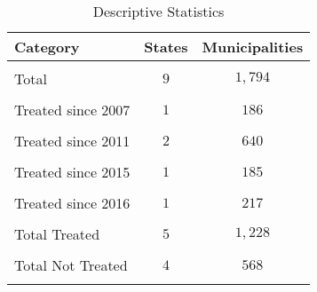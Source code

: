 \documentclass{article}
\begin{document}
\begin{table}[!htbp] \centering 
  \caption{Descriptive Statistics} 
  \label{} 
\normalsize 
\begin{tabular}{@{} l c c @{}} 
\hline \hline
Category & States & Municipalities \\ 
\hline \\
Total & $9$ & $1,794$ \\\\ [0.5em]
Treated since 2007 & $1$ & $186$ \\\\
Treated since 2011 & $2$ & $640$ \\\\
Treated since 2015 & $1$ & $185$ \\\\ 
Treated since 2016 & $1$ & $217$ \\\\ [0.5em]
Total Treated & $5$ & $1,228$ \\\\
Total Not Treated & $4$ & $568$ \\\\
\hline \hline
\end{tabular} 
\end{table} 
\end{document}
